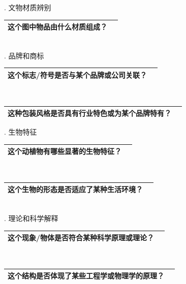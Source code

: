 \documentclass[12pt]{book}
\begin{document}
. 文物材质辨别

\begin{tabular}{|p{15cm}|p{3cm}|}
	\hline
这个图中物品由什么材质组成？\\
	\hline
\end{tabular}\\



. 品牌和商标

\begin{tabular}{|p{15cm}|p{3cm}|}
	\hline
这个标志/符号是否与某个品牌或公司关联？\\
	\hline
\end{tabular}\\


\begin{tabular}{|p{15cm}|p{3cm}|}
	\hline
这种包装风格是否具有行业特色或为某个品牌特有？\\
	\hline
\end{tabular}



. 生物特征

\begin{tabular}{|p{15cm}|p{3cm}|}
	\hline
这个动植物有哪些显著的生物特征？\\
	\hline
\end{tabular}\\



\begin{tabular}{|p{15cm}|p{3cm}|}
	\hline
这个生物的形态是否适应了某种生活环境？\\
	\hline
\end{tabular}\\



. 理论和科学解释

\begin{tabular}{|p{15cm}|p{3cm}|}
	\hline
这个现象/物体是否符合某种科学原理或理论？\\
	\hline
\end{tabular}\\



\begin{tabular}{|p{15cm}|p{3cm}|}
	\hline
这个结构是否体现了某些工程学或物理学的原理？\\
	\hline
\end{tabular}\\
\end{document}
